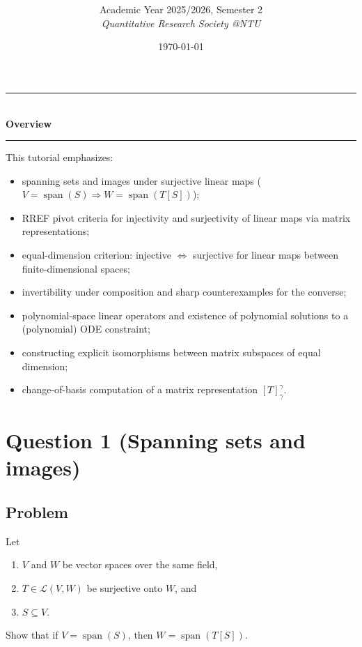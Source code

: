 \documentclass[12pt]{article}
\title{
\CourseCode\ \CourseName \\[0.3em]
\large \DocType
}
\author{
  Academic Year 2025/2026, Semester 2 \\[0.25em]
  \textit{Quantitative Research Society @NTU}
}
\date{\today}
\DeclareMathOperator{\Span}{span}
\begin{document}
\maketitle
\thispagestyle{plainfirst}
\pagestyle{main}

\begin{center}
  \rule{0.8\textwidth}{0.4pt}\\[4pt]
  \textbf{Overview}\\[2pt]
  \rule{0.8\textwidth}{0.4pt}
\end{center}

\noindent
This tutorial emphasizes:
\begin{itemize}[leftmargin=*]
  \item spanning sets and images under surjective linear maps ($V=\Span(S)\Rightarrow W=\Span(T[S])$);
  \item RREF pivot criteria for injectivity and surjectivity of linear maps via matrix representations;
  \item equal-dimension criterion: injective $\Leftrightarrow$ surjective for linear maps between finite-dimensional spaces;
  \item invertibility under composition and sharp counterexamples for the converse;
  \item polynomial-space linear operators and existence of polynomial solutions to a (polynomial) ODE constraint;
  \item constructing explicit isomorphisms between matrix subspaces of equal dimension;
  \item change-of-basis computation of a matrix representation $[T]_{\gamma}^{\gamma}$.
\end{itemize}

\newpage
\tableofcontents
\newpage

\section{Question 1 (Spanning sets and images)}
\subsection{Problem}
Let
\begin{enumerate}[label=(\roman*)]
\item $V$ and $W$ be vector spaces over the same field,
\item $T\in\mathcal{L}(V,W)$ be surjective onto $W$, and
\item $S\subseteq V$.
\end{enumerate}
Show that if $V=\operatorname{span}(S)$, then $W=\operatorname{span}(T[S])$.
\end{document}
